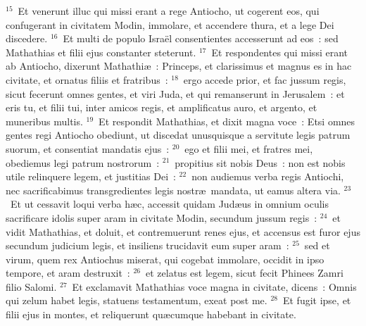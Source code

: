 ${}^{15}$~Et venerunt illuc qui missi erant a rege Antiocho, ut cogerent eos, qui confugerant in civitatem Modin, immolare, et accendere thura, et a lege Dei discedere.
${}^{16}$~Et multi de populo Isra\"el consentientes accesserunt ad eos~: sed Mathathias et filii ejus constanter steterunt.
${}^{17}$~Et respondentes qui missi erant ab Antiocho, dixerunt Mathathi\ae~: Princeps, et clarissimus et magnus es in hac civitate, et ornatus filiis et fratribus~:
${}^{18}$~ergo accede prior, et fac jussum regis, sicut fecerunt omnes gentes, et viri Juda, et qui remanserunt in Jerusalem~: et eris tu, et filii tui, inter amicos regis, et amplificatus auro, et argento, et muneribus multis.
${}^{19}$~Et respondit Mathathias, et dixit magna voce~: Etsi omnes gentes regi Antiocho obediunt, ut discedat unusquisque a servitute legis patrum suorum, et consentiat mandatis ejus~:
${}^{20}$~ego et filii mei, et fratres mei, obediemus legi patrum nostrorum~:
${}^{21}$~propitius sit nobis Deus~: non est nobis utile relinquere legem, et justitias Dei~:
${}^{22}$~non audiemus verba regis Antiochi, nec sacrificabimus transgredientes legis nostr\ae\ mandata, ut eamus altera via.
${}^{23}$~Et ut cessavit loqui verba h\ae c, accessit quidam Jud\ae us in omnium oculis sacrificare idolis super aram in civitate Modin, secundum jussum regis~:
${}^{24}$~et vidit Mathathias, et doluit, et contremuerunt renes ejus, et accensus est furor ejus secundum judicium legis, et insiliens trucidavit eum super aram~:
${}^{25}$~sed et virum, quem rex Antiochus miserat, qui cogebat immolare, occidit in ipso tempore, et aram destruxit~:
${}^{26}$~et zelatus est legem, sicut fecit Phinees Zamri filio Salomi.
${}^{27}$~Et exclamavit Mathathias voce magna in civitate, dicens~: Omnis qui zelum habet legis, statuens testamentum, exeat post me.
${}^{28}$~Et fugit ipse, et filii ejus in montes, et reliquerunt qu\ae cumque habebant in civitate.


